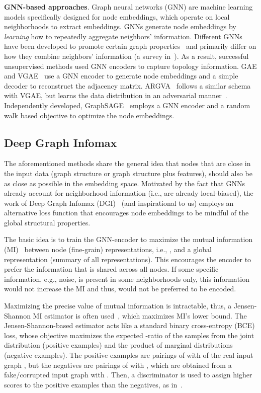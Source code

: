 \documentclass{article}
\begin{document}
\noindent
\textbf{GNN-based approaches}. Graph neural networks (GNN) are machine learning models specifically designed for node embeddings, which operate on local neighborhoods to extract embeddings.  GNNs generate node embeddings by \textit{learning} how to  repeatedly aggregate neighbors' information. Different GNNs have been developed to promote certain graph properties~\cite{atwood2016diffusion, niepert2016learning, kipf2016semi,  hamilton2017inductive, velickovic2018graph, liu2019geniepath} and primarily differ on how they combine neighbors' information (a survey in~\cite{wu2020comprehensive}). 
As a result, successful unsupervised methods used GNN encoders to capture topology information. GAE and VGAE~\cite{kipf2016variational} use a GNN encoder to generate node embeddings and a simple decoder to reconstruct the adjacency matrix. ARGVA~\cite{pan2018adversarially} follows a similar schema with VGAE, but learns the data distribution in an adversarial manner~\cite{goodfellow2014generative}. Independently developed, GraphSAGE~\cite{hamilton2017representation} employs a GNN encoder and a random walk based objective to optimize the node embeddings.

\subsection{Deep Graph Infomax}
The aforementioned methods share the general idea that nodes that are close in the input data (graph structure or graph structure plus features), should also be as close as possible in the embedding space.
Motivated by the fact that GNNs already account for neighborhood information (i.e., are already local-biased), the work of Deep Graph Infomax (DGI)~\cite{velickovic2018deep} (and inspirational to us) employs an alternative loss function that encourages node embeddings to be mindful of the global structural properties.

The basic idea is to train the GNN-encoder  to maximize the mutual information (MI)~\cite{shannon1948mathematical, cover1991elements} between node (fine-grain) representations, i.e., , and a global representation (summary of all representations).  This encourages the encoder to prefer the information that is shared across all nodes. If some specific information, e.g., noise, is present in some neighborhoods only, this information would not increase the MI and thus, would not be preferred to be encoded. 



Maximizing the precise value of mutual information is intractable, thus, a Jensen-Shannon MI estimator is often used~\cite{hjelm2018learning, oord2018representation}, which maximizes MI's lower bound. The Jensen-Shannon-based estimator acts like a standard binary cross-entropy (BCE) loss, whose objective maximizes the expected -ratio of the samples from the joint distribution (positive examples) and the product of marginal distributions (negative examples). The positive examples are pairings of  with  of the real input graph  , but the negatives  are pairings of  with , which are obtained from a fake/corrupted input graph  with . Then, a discriminator  is used to assign higher scores to the positive examples than the negatives, as in~\cite{hjelm2018learning, oord2018representation}.
\end{document}
